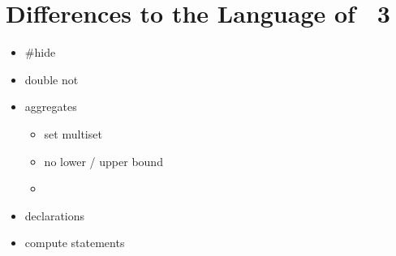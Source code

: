 \section{Differences to the Language of \gringo~3}\label{sec:gringo:tri}
\tbf

\begin{itemize}
\item \#hide
\item double not
\item aggregates
  \begin{itemize}
  \item set multiset
  \item no lower / upper bound
  \item {} 
  \end{itemize}
\item {} declarations
\item compute statements
\end{itemize}

